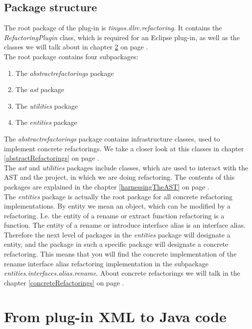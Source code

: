 \documentclass[a4paper,10pt]{report}
\begin{document}
\section{Package structure}
The root package of the plug-in is {\it tinyos.dlrc.refactoring}.
It contains the {\it RefactoringPlugin} class, which is required for an Eclipse plug-in, as well as the classes we will talk about in chapter \ref{fromPluginXMLToJavaCode} on page \pageref{fromPluginXMLToJavaCode}.\\
The root package contains four subpackages:
   \begin{enumerate}
     \item The {\it abstractrefactorings} package
     \item The {\it ast} package
     \item The {\it utilities} package
     \item The {\it entities} package
   \end{enumerate}
The {\it abstractrefactorings} package contains infrastructure classes, used to implement concrete refactorings.
We take a closer look at this classes in chapter \ref{abstractRefactorings} on page \pageref{abstractRefactorings}.\\
The {\it ast} and {\it utilities} packages include classes, which are used to interact with the AST and the project, in which we are doing refactoring.
The contents of this packages are explained in the chapter \ref{harnessingTheAST} on page \pageref{harnessingTheAST}.\\
The {\it entities} package is actually the root package for all concrete refactoring implementations.
By entity we mean an object, which can be modified by a refactoring.
I.e. the entity of a rename or extract function refactoring is a function.
The entity of a rename or introduce interface alias is an interface alias.
Therefore the next level of packages in the {\it entities} package will designate a entity, and the package in such a specific package will designate a concrete refactoring.
This means that you will find the concrete implementation of the rename interface alias refactoring implementation in the subpackage {\it entities.interfaces.alias.rename}.
About concrete refactorings we will talk in the chapter \ref{concreteRefactorings} on page \pageref{concreteRefactorings}.


\chapter{From plug-in XML to Java code}
\label{fromPluginXMLToJavaCode}
\end{document}
